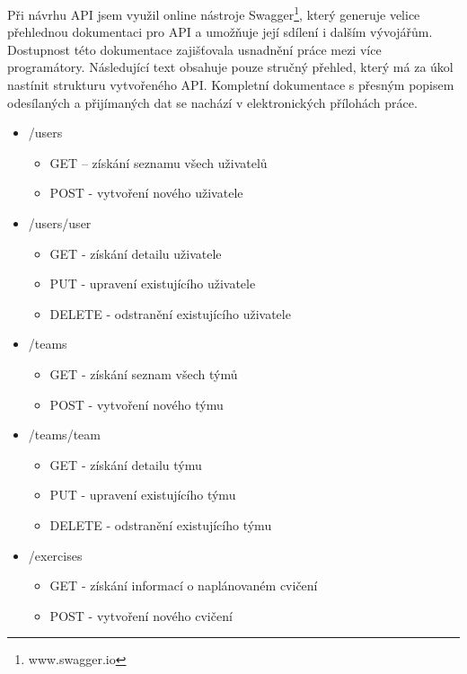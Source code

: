 \documentclass[
  digital, %
  twoside, %
  table,   %
  lof,     %
  lot,     %
]{fithesis3}
\begin{document}
Při návrhu API jsem využil online nástroje Swagger\footnote{www.swagger.io}, který generuje velice přehlednou dokumentaci pro API a umožňuje její sdílení i dalším vývojářům. Dostupnost této dokumentace zajišťovala usnadnění práce mezi více programátory. Následující text obsahuje pouze stručný přehled, který má za úkol nastínit strukturu vytvořeného API. Kompletní dokumentace s přesným popisem odesílaných a přijímaných dat se nachází v elektronických přílohách práce.

\renewcommand\labelitemii{$\square$}
\begin{itemize}
    \item /users
    \begin{itemize}
        \item GET -- získání seznamu všech uživatelů
        \item POST -  vytvoření nového uživatele
    \end{itemize}
    
    \item /users/{user}
    \begin{itemize}
        \item GET - získání detailu uživatele
        \item PUT - upravení existujícího uživatele
        \item DELETE - odstranění existujícího uživatele
    \end{itemize}
    
    \item /teams
    \begin{itemize}
        \item GET - získání seznam všech týmů
        \item POST -  vytvoření nového týmu
    \end{itemize}
    
    \item /teams/{team}
    \begin{itemize}
        \item GET - získání detailu týmu
        \item PUT - upravení existujícího týmu
        \item DELETE - odstranění existujícího týmu
    \end{itemize}
    
    \item /exercises
    \begin{itemize}
        \item GET - získání informací o naplánovaném cvičení
        \item POST - vytvoření nového cvičení
    \end{itemize}
    

\end{itemize}
\end{document}
